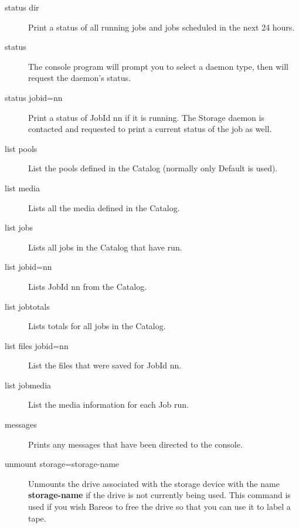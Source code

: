 \begin{description}

\item [status dir]
   Print a status of all running jobs and jobs  scheduled in the next 24 hours.

\item [status]
   The console program will prompt you to select  a daemon type, then will
request the daemon's status.

\item [status jobid=nn]
   Print a status of JobId nn if it is running.  The Storage daemon is contacted
and requested to print a current  status of the job as well.

\item [list pools]
   List the pools defined in the Catalog (normally  only Default is used).

\item [list media]
   Lists all the media defined in the Catalog.

\item [list jobs]
   Lists all jobs in the Catalog that have run.

\item [list jobid=nn]
   Lists JobId nn from the Catalog.

\item [list jobtotals]
   Lists totals for all jobs in the Catalog.

\item [list files jobid=nn]
   List the files that were saved for JobId nn.

\item [list jobmedia]
   List the media information for each Job run.

\item [messages]
   Prints any messages that have been directed to the console.

\item [unmount storage=storage-name]
   Unmounts the drive associated with the storage  device with the name {\bf
storage-name} if the drive is not currently being  used. This command is used
if you wish Bareos to free the drive so  that you can use it to label a tape.



\end{description}
